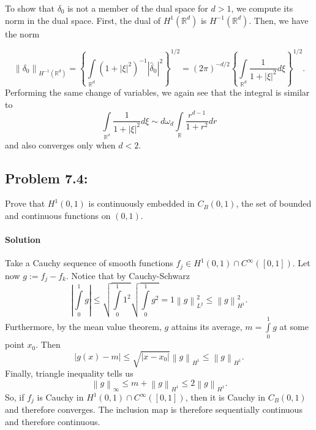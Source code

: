 \documentclass[letterpaper,twoside,11pt]{article}
\theoremstyle{mystyle}
\newcommand{\R}{{\mathbb R}}
\begin{document}
To show that $\delta_0$ is not a member of the dual space for $d>1$, we compute its norm in the dual space. First, the dual of $H^1\left( \R^d \right)$ is $H^{-1}\left( \R^d \right)$. Then, we have the norm 

\[{\left\| {{\delta _0}} \right\|_{{H^{ - 1}}\left( {{\mathbb{R}^d}} \right)}} = {\left\{ {\int\limits_{{\mathbb{R}^d}} {{{\left( {1 + {{\left| \xi  \right|}^2}} \right)}^{ - 1}}{{\left| {{{\hat \delta }_0}} \right|}^2}} } \right\}^{1/2}} = {\left( {2\pi } \right)^{ - d/2}}{\left\{ {\int\limits_{{\mathbb{R}^d}} {\frac{1}{{1 + {{\left| \xi  \right|}^2}}}d\xi } } \right\}^{1/2}}.\]
Performing the same change of variables, we again see that the integral is similar to 
\[\int\limits_\mathbb{R^d} {\frac{1}{{1 + {{\left| \xi  \right|}^2}}}d\xi } \sim d{\omega _d}\int\limits_\mathbb{R} {\frac{{{r^{d - 1}}}}{{1 + {r^2}}}dr} \]
and also converges only when $d<2$. 



\newpage
\subsection*{Problem 7.4:}
Prove that $H^1(0,1)$ is continuously embedded in $C_B(0,1)$, the set of bounded and continuous functions on $(0,1)$. 

\paragraph*{Solution} Take a Cauchy sequence of smooth functions $f_j \in H^1\left( 0,1 \right) \cap C^\infty \left( [0,1] \right)$. Let now $ g := f_j - f_k$. Notice that by Cauchy-Schwarz
\[\left| {\int\limits_0^1 g } \right| \leqslant \sqrt {\int\limits_0^1 {{1^2}} } \sqrt {\int\limits_0^1 {{g^2}} }  = 1\left\| g \right\|_{{L^2}}^2 \leqslant \left\| g \right\|_{{H^1}}^2.\]
Furthermore, by the mean value theorem, $g$ attains its average, $m = \int\limits_0^1 g $ at some point $x_0$. Then 
\[\left| {g\left( x \right) - m} \right| \leqslant \sqrt {\left| {x - {x_0}} \right|} {\left\| g \right\|_{{H^1}}} \leqslant {\left\| g \right\|_{{H^1}}}.\]
Finally, triangle inequality tells us 
\[{\left\| g \right\|_\infty } \leqslant m + {\left\| g \right\|_{{H^1}}} \leqslant 2{\left\| g \right\|_{{H^1}}}.\]
So, if $f_j$ is Cauchy in $H^1\left( 0,1 \right) \cap C^\infty \left( [0,1] \right)$, then it is Cauchy in $C_B(0,1)$ and therefore converges. The inclusion map is therefore sequentially continuous and therefore continuous. 
\end{document}
